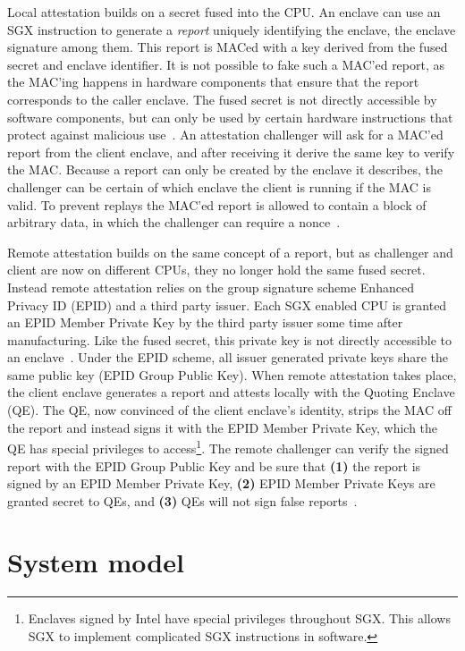 \documentclass{article}
\begin{document}
			Local attestation builds on a secret fused into the CPU.
			An enclave can use an SGX instruction to generate a \textit{report} uniquely identifying the enclave, the enclave signature among them.
			This report is MACed with a key derived from the fused secret and enclave identifier.
			It is not possible to fake such a MAC'ed report, as the MAC'ing happens in hardware components that ensure that the report corresponds to the caller enclave.
			The fused secret is not directly accessible by software components, but can only be used by certain hardware instructions that protect against malicious use~\cite{costan_intel_2016}.
			An attestation challenger will ask for a MAC'ed report from the client enclave, and after receiving it derive the same key to verify the MAC.
			Because a report can only be created by the enclave it describes, the challenger can be certain of which enclave the client is running if the MAC is valid.
			To prevent replays the MAC'ed report is allowed to contain a block of arbitrary data, in which the challenger can require a nonce~\cite{costan_intel_2016}.

			Remote attestation builds on the same concept of a report, but as challenger and client are now on different CPUs, they no longer hold the same fused secret.
			Instead remote attestation relies on the group signature scheme Enhanced Privacy ID (EPID) and a third party issuer.
			Each SGX enabled CPU is granted an EPID Member Private Key by the third party issuer some time after manufacturing.
			Like the fused secret, this private key is not directly accessible to an enclave~\cite{costan_intel_2016}.
			Under the EPID scheme, all issuer generated private keys share the same public key (EPID Group Public Key).
			When remote attestation takes place, the client enclave generates a report and attests locally with the Quoting Enclave (QE).
			The QE, now convinced of the client enclave's identity, strips the MAC off the report and instead signs it with the EPID Member Private Key, which the QE has special privileges to access\footnote{Enclaves signed by Intel have special privileges throughout SGX. This allows SGX to implement complicated SGX instructions in software.}.
			The remote challenger can verify the signed report with the EPID Group Public Key and be sure that \textbf{(1)} the report is signed by an EPID Member Private Key, \textbf{(2)} EPID Member Private Keys are granted secret to QEs, and \textbf{(3)} QEs will not sign false reports~\cite{costan_intel_2016}.

	\section{System model}
\end{document}
